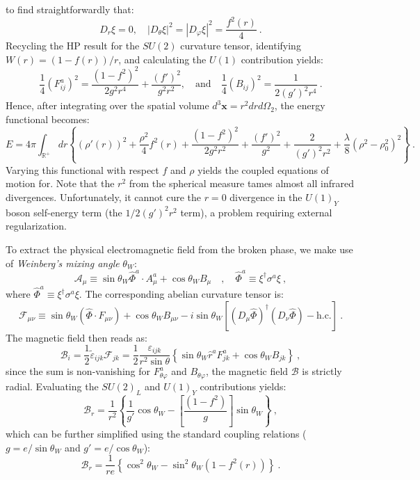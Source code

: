 \documentclass[a4paper,11pt]{article}
\begin{document}
to find straightforwardly that:
\begin{equation}
    D_r \xi = 0, \quad |D_\theta \xi|^2 = |D_\varphi \xi|^2 = \frac{f^2(r)}{4}\ .
\end{equation}
Recycling the HP result for the $SU(2)$ curvature tensor, identifying $W(r) = (1-f(r))/r$, and calculating the $U(1)$ contribution yields:
\begin{equation}
    \frac{1}{4}(F_{ij}^a)^2 = \frac{(1-f^2)^2}{2g^2r^4} + \frac{(f')^2}{g^2r^2}, \quad \text{and} \quad \frac{1}{4}(B_{ij})^2 = \frac{1}{2(g')^2 r^4}\ .
\end{equation}
Hence, after integrating over the spatial volume $d^3\boldsymbol{x} = r^2 dr d\Omega_2$, the energy functional becomes:
\begin{equation}
    E= 4\pi \int_{\mathbb{R}^+} dr \left\{ (\rho'(r))^2 + \frac{\rho^2}{4} f^2(r) + \frac{(1-f^2)^2}{2g^2 r^2} + \frac{(f')^2}{g^2} + \frac{2}{(g')^2 r^2} + \frac{\lambda}{8}(\rho^2 - \rho_0^2)^2 \right\}\ .
\end{equation}
Varying this functional with respect $f$ and $\rho$ yields the coupled equations of motion for. Note that the $r^2$ from the spherical measure tames almost all infrared divergences. Unfortunately, it cannot cure the $r=0$ divergence in the $U(1)_Y$ boson self-energy term (the $1/2(g')^2 r^2$ term), a problem requiring external regularization.

To extract the physical electromagnetic field from the broken phase, we make use of \textit{Weinberg's mixing angle} $\theta_W$:
\begin{equation}
    \mathcal{A}_\mu \equiv \sin\theta_W \hat{\Phi}^a \cdot A_\mu^a + \cos\theta_W B_\mu\quad ,\quad \hat{\Phi}^a\equiv \xi^\dagger \sigma^a \xi\ ,
\end{equation}
where $\hat{\Phi}^a \equiv \xi^\dagger \sigma^a \xi$. The corresponding abelian curvature tensor is:
\begin{equation}
    \mathcal{F}_{\mu\nu} \equiv \sin\theta_W (\hat{\Phi}\cdot F_{\mu\nu}) + \cos\theta_W B_{\mu\nu} - i \sin\theta_W [(D_\mu \hat{\Phi})^\dagger (D_\nu \hat{\Phi}) - \text{h.c.}]\ .
\end{equation}
The magnetic field then reads as:
\begin{equation}
    \mathcal{B}_i = \frac{1}{2} \tilde\varepsilon_{ijk} \mathcal{F}_{jk} = \frac{1}{2} \frac{\varepsilon_{ijk}}{r^2\sin\theta} \left\{ \sin\theta_W \hat{r}^a F_{jk}^a + \cos\theta_W B_{jk} \right\}\ ,
\end{equation}
since the sum is non-vanishing for $F_{\theta\varphi}^a$ and $B_{\theta\varphi}$, the magnetic field $\boldsymbol{\mathcal{B}}$ is strictly radial. Evaluating the $SU(2)_L$ and $U(1)_Y$ contributions yields:
\begin{equation}
    \mathcal{B}_r = \frac{1}{r^2} \left\{\frac{1}{g'}\cos\theta_W- \left[\frac{(1-f^2)}{g} \right]\sin\theta_W  \right\}\ ,
\end{equation}
which can be further simplified using the standard coupling relations ($g = e/\sin\theta_W$ and $g' = e/\cos\theta_W$):
\begin{equation}
    \mathcal{B}_r = \frac{1}{re} \left\{ \cos^2\theta_W - \sin^2\theta_W (1-f^2(r)) \right\}\ .
\end{equation}
\end{document}
